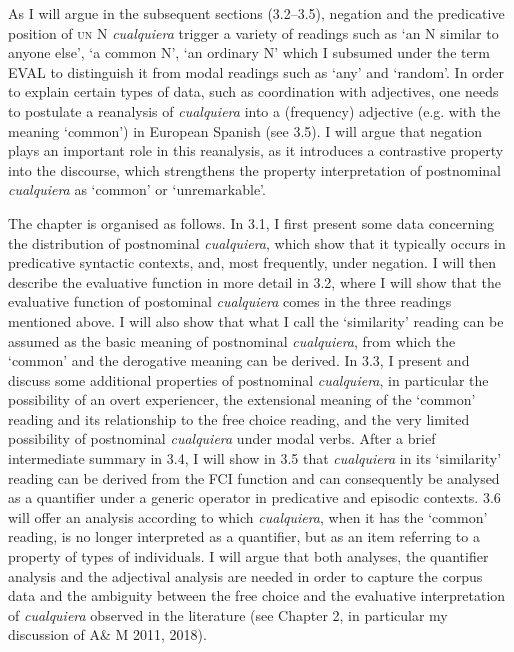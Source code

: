   As I will argue in the subsequent sections (3.2–3.5), negation and the predicative position of \textsc{un} N \textit{cualquiera} trigger a variety of readings such as ‘an N similar to anyone else’, ‘a common N’, ‘an ordinary N’ which I subsumed under the term EVAL to distinguish it from modal readings such as ‘any’ and ‘random’. In order to explain certain types of data, such as coordination with adjectives, one needs to postulate a reanalysis of \textit{cualquiera} into a (frequency) adjective (e.g. with the meaning ‘common’) in European Spanish (see 3.5). I will argue that negation plays an important role in this reanalysis, as it introduces a contrastive property into the discourse, which strengthens the property interpretation of postnominal \textit{cualquiera} as ‘common’ or ‘unremarkable’.

  The chapter is organised as follows. In 3.1, I first present some data concerning the distribution of postnominal \textit{cualquiera}, which show that it typically occurs in predicative syntactic contexts, and, most frequently, under negation. I will then describe the evaluative function in more detail in 3.2, where I will show that the evaluative function of postominal \textit{cualquiera} comes in the three readings mentioned above. I will also show that what I call the ‘similarity’ reading can be assumed as the basic meaning of postnominal \textit{cualquiera}, from which the ‘common’ and the derogative meaning can be derived. In 3.3, I present and discuss some additional properties of postnominal \textit{cualquiera}, in particular the possibility of an overt experiencer, the extensional meaning of the ‘common’ reading and its relationship to the free choice reading, and the very limited possibility of postnominal \textit{cualquiera} under modal verbs. After a brief intermediate summary in 3.4, I will show in 3.5 that \textit{cualquiera} in its ‘similarity’ reading can be derived from the FCI function and can consequently be analysed as a quantifier under a generic operator in predicative and episodic contexts. 3.6 will offer an analysis according to which \textit{cualquiera}, when it has the ‘common’ reading, is no longer interpreted as a quantifier, but as an item referring to a property of types of individuals. I will argue that both analyses, the quantifier analysis and the adjectival analysis are needed in order to capture the corpus data and the ambiguity between the free choice and the evaluative interpretation of \textit{cualquiera} observed in the literature (see Chapter 2, in particular my discussion of A\& M 2011, 2018).

